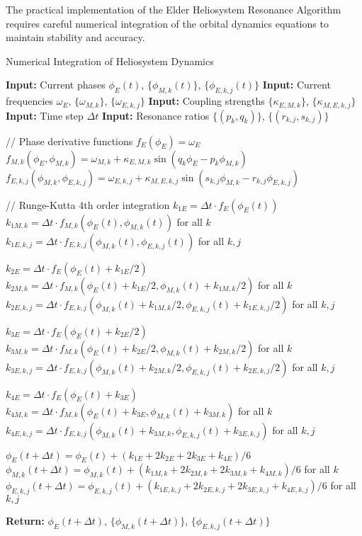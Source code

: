 The practical implementation of the Elder Heliosystem Resonance Algorithm requires careful numerical integration of the orbital dynamics equations to maintain stability and accuracy.

\begin{algorithm}
\caption{Numerical Integration of Heliosystem Dynamics}
\begin{algorithmic}[1]
\State \textbf{Input:} Current phases $\phi_E(t)$, $\{\phi_{M,k}(t)\}$, $\{\phi_{E,k,j}(t)\}$
\State \textbf{Input:} Current frequencies $\omega_E$, $\{\omega_{M,k}\}$, $\{\omega_{E,k,j}\}$
\State \textbf{Input:} Coupling strengths $\{\kappa_{E,M,k}\}$, $\{\kappa_{M,E,k,j}\}$
\State \textbf{Input:} Time step $\Delta t$
\State \textbf{Input:} Resonance ratios $\{(p_k,q_k)\}$, $\{(r_{k,j},s_{k,j})\}$

\State // Phase derivative functions
\State $f_E(\phi_E) = \omega_E$
\State $f_{M,k}(\phi_E, \phi_{M,k}) = \omega_{M,k} + \kappa_{E,M,k} \sin(q_k\phi_E - p_k\phi_{M,k})$
\State $f_{E,k,j}(\phi_{M,k}, \phi_{E,k,j}) = \omega_{E,k,j} + \kappa_{M,E,k,j} \sin(s_{k,j}\phi_{M,k} - r_{k,j}\phi_{E,k,j})$

\State // Runge-Kutta 4th order integration
\State $k_{1E} = \Delta t \cdot f_E(\phi_E(t))$
\State $k_{1M,k} = \Delta t \cdot f_{M,k}(\phi_E(t), \phi_{M,k}(t))$ for all $k$
\State $k_{1E,k,j} = \Delta t \cdot f_{E,k,j}(\phi_{M,k}(t), \phi_{E,k,j}(t))$ for all $k,j$

\State $k_{2E} = \Delta t \cdot f_E(\phi_E(t) + k_{1E}/2)$
\State $k_{2M,k} = \Delta t \cdot f_{M,k}(\phi_E(t) + k_{1E}/2, \phi_{M,k}(t) + k_{1M,k}/2)$ for all $k$
\State $k_{2E,k,j} = \Delta t \cdot f_{E,k,j}(\phi_{M,k}(t) + k_{1M,k}/2, \phi_{E,k,j}(t) + k_{1E,k,j}/2)$ for all $k,j$

\State $k_{3E} = \Delta t \cdot f_E(\phi_E(t) + k_{2E}/2)$
\State $k_{3M,k} = \Delta t \cdot f_{M,k}(\phi_E(t) + k_{2E}/2, \phi_{M,k}(t) + k_{2M,k}/2)$ for all $k$
\State $k_{3E,k,j} = \Delta t \cdot f_{E,k,j}(\phi_{M,k}(t) + k_{2M,k}/2, \phi_{E,k,j}(t) + k_{2E,k,j}/2)$ for all $k,j$

\State $k_{4E} = \Delta t \cdot f_E(\phi_E(t) + k_{3E})$
\State $k_{4M,k} = \Delta t \cdot f_{M,k}(\phi_E(t) + k_{3E}, \phi_{M,k}(t) + k_{3M,k})$ for all $k$
\State $k_{4E,k,j} = \Delta t \cdot f_{E,k,j}(\phi_{M,k}(t) + k_{3M,k}, \phi_{E,k,j}(t) + k_{3E,k,j})$ for all $k,j$

\State $\phi_E(t+\Delta t) = \phi_E(t) + (k_{1E} + 2k_{2E} + 2k_{3E} + k_{4E})/6$
\State $\phi_{M,k}(t+\Delta t) = \phi_{M,k}(t) + (k_{1M,k} + 2k_{2M,k} + 2k_{3M,k} + k_{4M,k})/6$ for all $k$
\State $\phi_{E,k,j}(t+\Delta t) = \phi_{E,k,j}(t) + (k_{1E,k,j} + 2k_{2E,k,j} + 2k_{3E,k,j} + k_{4E,k,j})/6$ for all $k,j$

\State \textbf{Return:} $\phi_E(t+\Delta t)$, $\{\phi_{M,k}(t+\Delta t)\}$, $\{\phi_{E,k,j}(t+\Delta t)\}$
\end{algorithmic}
\end{algorithm}


